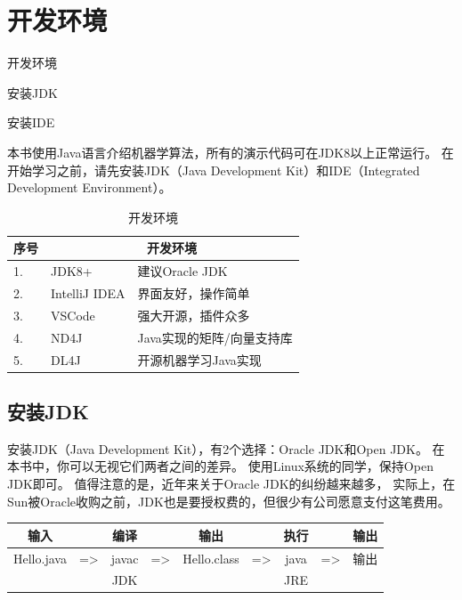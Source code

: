 \chapter{开发环境}

\begin{introduction}
	\item 开发环境
	\item 安装JDK
	\item 安装IDE
\end{introduction}

本书使用Java语言介绍机器学算法，所有的演示代码可在JDK8以上正常运行。
在开始学习之前，请先安装JDK（Java Development Kit）和IDE（Integrated Development Environment）。

\begin{table}[!htbp]\centering
	\caption{开发环境}
	\begin{tabular}{|p{1cm}|p{3cm}|p{8cm}|}
	\toprule
	序号 & \multicolumn{2}{|c|}{开发环境}\\
	\midrule
	1. & JDK8+&建议Oracle JDK\\
	\hline
	2. & IntelliJ IDEA&界面友好，操作简单\\
	\hline
	3. & VSCode&强大开源，插件众多\\
	\hline
	4. & ND4J&Java实现的矩阵/向量支持库\\
	\hline
	5. & DL4J&开源机器学习Java实现\\
	\bottomrule
	\end{tabular}
	\label{tab:part1_dev_env}
\end{table}

\section{安装JDK}
安装JDK（Java Development Kit），有2个选择：Oracle JDK和Open JDK。
在本书中，你可以无视它们两者之间的差异。
使用Linux系统的同学，保持Open JDK即可。
值得注意的是，近年来关于Oracle JDK的纠纷越来越多，
实际上，在Sun被Oracle收购之前，JDK也是要授权费的，但很少有公司愿意支付这笔费用。

\begin{table}[!htbp]\centering \small
	\begin{tabular}{cc|c|ccc|c|cc}
		\toprule
		输入&&编译&&输出&&执行&&输出 \\
		\midrule
		Hello.java&=>&javac&=>&Hello.class&=>&java&=>&输出 \\
		&&JDK&&&&JRE&& \\
		\bottomrule
	\end{tabular}
\end{table}

